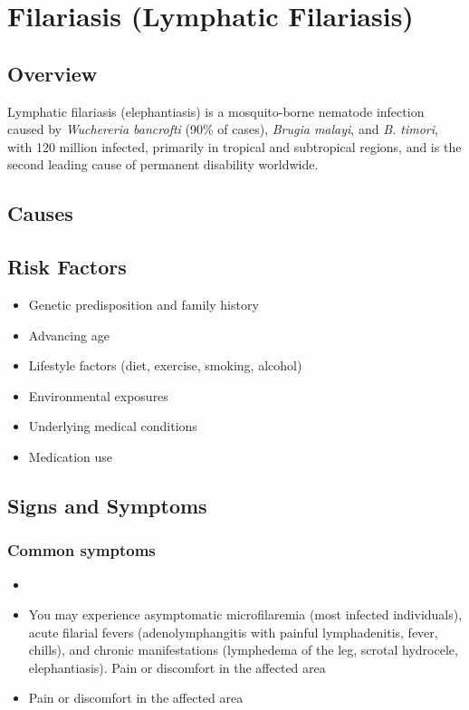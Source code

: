 \chapter{Filariasis (Lymphatic Filariasis)}
\label{sec:Filariasis}

\section{Overview}
Lymphatic filariasis (elephantiasis) is a mosquito-borne nematode infection caused by \textit{Wuchereria bancrofti} (90\% of cases), \textit{Brugia malayi}, and \textit{B. timori}, with 120 million infected, primarily in tropical and subtropical regions, and is the second leading cause of permanent disability worldwide.
\section{Causes}
\section{Risk Factors}

\begin{itemize}[noitemsep]
  \item Genetic predisposition and family history
  \item Advancing age
  \item Lifestyle factors (diet, exercise, smoking, alcohol)
  \item Environmental exposures
  \item Underlying medical conditions
  \item Medication use
\end{itemize}
\section{Signs and Symptoms}

\subsection{Common symptoms}
\begin{itemize}[noitemsep]
  \item \item You may experience asymptomatic microfilaremia (most infected individuals), acute filarial fevers (adenolymphangitis with painful lymphadenitis, fever, chills), and chronic manifestations (lymphedema of the leg, scrotal hydrocele, elephantiasis). Pain or discomfort in the affected area    \item Pain or discomfort in the affected area
  \end{itemize}

